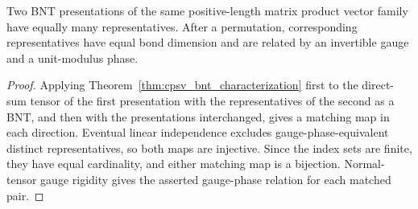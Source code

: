 \begin{lemma}
    \label{thm:cpsv_bnt_presentation_uniqueness}
    \leanok
    Two BNT presentations of the same positive-length matrix product
    vector family have equally many representatives. After a permutation,
    corresponding representatives have equal bond dimension and are related
    by an invertible gauge and a unit-modulus phase.
\end{lemma}

\begin{proof}\leanok
    Applying Theorem~\ref{thm:cpsv_bnt_characterization} first to the
    direct-sum tensor of the first presentation with the representatives of the
    second as a BNT, and then with the presentations interchanged, gives a
    matching map in each direction. Eventual linear independence excludes
    gauge-phase-equivalent distinct representatives, so both maps are
    injective. Since the index sets are finite, they have equal cardinality,
    and either matching map is a bijection. Normal-tensor gauge rigidity gives
    the asserted gauge-phase relation for each matched pair.
\end{proof}

